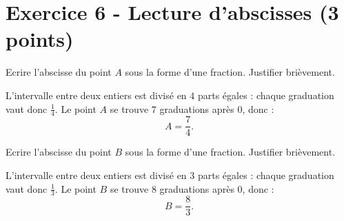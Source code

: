 \documentclass[answers]{exam}
\begin{document}
\section*{Exercice 6 - Lecture d'abscisses (3 points)}

\begin{questions}

  \question[0.75] Ecrire l'abscisse du point $A$ sous la forme d'une fraction. Justifier brièvement.


  \begin{solution}
    L'intervalle entre deux entiers est divisé en $4$ parts égales : chaque graduation vaut donc $\frac{1}{4}$. Le point $A$ se trouve $7$ graduations après $0$, donc :
    \[
      A = \dfrac{7}{4}.
    \]
  \end{solution}

  \question[0.75] Ecrire l'abscisse du point $B$ sous la forme d'une fraction. Justifier brièvement.


  \begin{solution}
    L'intervalle entre deux entiers est divisé en $3$ parts égales : chaque graduation vaut donc $\frac{1}{3}$. Le point $B$ se trouve $8$ graduations après $0$, donc :
    \[
      B = \dfrac{8}{3}.
    \]
  \end{solution}


\end{questions}
\end{document}
